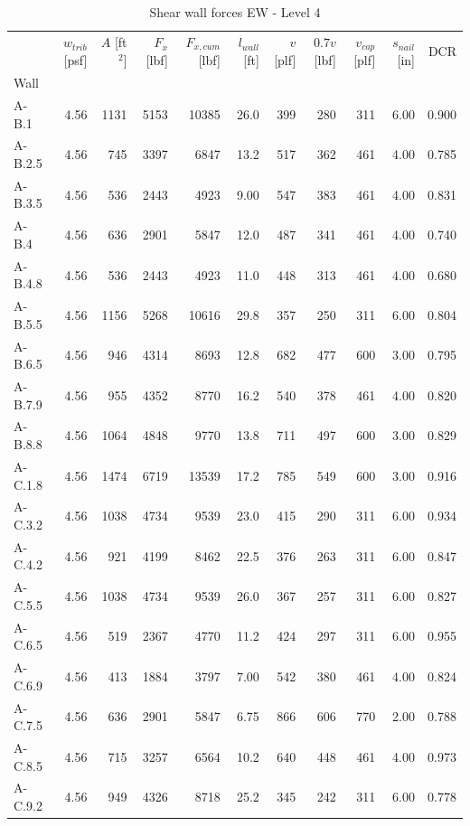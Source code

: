\documentclass[11pt]{article}
\begin{document}
    
    \begin{table}[H]
\centering
\caption{Shear wall forces EW - Level 4}
\label{tab:shear_wall_forces_level4_ew}
\begin{tabular}{lrrrrrrrrrr}
\toprule
 & $w_{trib}$ [psf] & $A$ [ft$^2$] & $F_x$ [lbf] & $F_{x,cum}$ [lbf] & $l_{wall}$ [ft] & $v$ [plf] & $0.7 v$ [lbf] & $v_{cap}$ [plf] & $s_{nail}$ [in] & DCR \\
Wall &  &  &  &  &  &  &  &  &  &  \\
\midrule
A-B.1 & 4.56 & 1131 & 5153 & 10385 & 26.0 & 399 & 280 & 311 & 6.00 & 0.900 \\
A-B.2.5 & 4.56 & 745 & 3397 & 6847 & 13.2 & 517 & 362 & 461 & 4.00 & 0.785 \\
A-B.3.5 & 4.56 & 536 & 2443 & 4923 & 9.00 & 547 & 383 & 461 & 4.00 & 0.831 \\
A-B.4 & 4.56 & 636 & 2901 & 5847 & 12.0 & 487 & 341 & 461 & 4.00 & 0.740 \\
A-B.4.8 & 4.56 & 536 & 2443 & 4923 & 11.0 & 448 & 313 & 461 & 4.00 & 0.680 \\
A-B.5.5 & 4.56 & 1156 & 5268 & 10616 & 29.8 & 357 & 250 & 311 & 6.00 & 0.804 \\
A-B.6.5 & 4.56 & 946 & 4314 & 8693 & 12.8 & 682 & 477 & 600 & 3.00 & 0.795 \\
A-B.7.9 & 4.56 & 955 & 4352 & 8770 & 16.2 & 540 & 378 & 461 & 4.00 & 0.820 \\
A-B.8.8 & 4.56 & 1064 & 4848 & 9770 & 13.8 & 711 & 497 & 600 & 3.00 & 0.829 \\
A-C.1.8 & 4.56 & 1474 & 6719 & 13539 & 17.2 & 785 & 549 & 600 & 3.00 & 0.916 \\
A-C.3.2 & 4.56 & 1038 & 4734 & 9539 & 23.0 & 415 & 290 & 311 & 6.00 & 0.934 \\
A-C.4.2 & 4.56 & 921 & 4199 & 8462 & 22.5 & 376 & 263 & 311 & 6.00 & 0.847 \\
A-C.5.5 & 4.56 & 1038 & 4734 & 9539 & 26.0 & 367 & 257 & 311 & 6.00 & 0.827 \\
A-C.6.5 & 4.56 & 519 & 2367 & 4770 & 11.2 & 424 & 297 & 311 & 6.00 & 0.955 \\
A-C.6.9 & 4.56 & 413 & 1884 & 3797 & 7.00 & 542 & 380 & 461 & 4.00 & 0.824 \\
A-C.7.5 & 4.56 & 636 & 2901 & 5847 & 6.75 & 866 & 606 & 770 & 2.00 & 0.788 \\
A-C.8.5 & 4.56 & 715 & 3257 & 6564 & 10.2 & 640 & 448 & 461 & 4.00 & 0.973 \\
A-C.9.2 & 4.56 & 949 & 4326 & 8718 & 25.2 & 345 & 242 & 311 & 6.00 & 0.778 \\
\bottomrule
\end{tabular}
\end{table}
\end{document}
